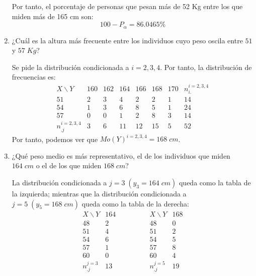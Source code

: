 \begin{ejercicio}
\begin{enumerate}
        Por tanto, el porcentaje de personas que pesan más de 52 Kg entre los que miden más de 165 cm son:
        \begin{equation*}
            100-P_\alpha = 86.0465\%
        \end{equation*}

        \item ¿Cuál es la altura más frecuente entre los individuos cuyo peso oscila entre $51$ y $57\;Kg$?

        Se pide la distribución condicionada a $i=2,3,4$. Por tanto, la distribución de frecuencias es:
        \begin{equation*}
            \begin{array}{c|cccccc|c}
                X\backslash Y & 160 & 162 & 164 & 166 & 168 & 170 & n_{i.}^{i=2,3,4}\\ \hline
                51 & 2 & 3 & 4 & 2 & 2 & 1 & 14\\
                54 & 1 & 3 & 6 & 8 & 5 & 1 & 24\\
                57 & 0 & 0 & 1 & 2 & 8 & 3 & 14\\ \hline
                n_{.j}^{i=2,3,4} & 3 & 6 & 11 & 12 & 15 & 5 & 52
            \end{array}
        \end{equation*}
        Por tanto, podemos ver que $Mo(Y)^{i=2,3,4} = 168\;cm$.

        \item ¿Qué peso medio es más representativo, el de los individuos que miden $164\;cm$ o el de los que miden $168\;cm$?

        La distribución condicionada a $j=3\;(y_3 = 164\;cm)$ queda como la tabla de la izquierda; mientras que la distribución condicionada a $j=5\;(y_5 = 168\;cm)$ queda como la tabla de la derecha:
        \begin{equation*}
            \begin{array}{c|c}
                X\backslash Y & 164\\ \hline
                48 & 2 \\
                51 & 4 \\
                54 & 6 \\
                57 & 1 \\
                60 & 0 \\ \hline
                n_{.j}^{j=3}& 13
            \end{array}
            \qquad \qquad
            \begin{array}{c|c}
                X\backslash Y & 168\\ \hline
                48 & 0 \\
                51 & 2 \\
                54 & 5 \\
                57 & 8 \\
                60 & 4 \\ \hline
                n_{.j}^{j=5}& 19
            \end{array}
        \end{equation*}


\end{enumerate}
\end{ejercicio}
